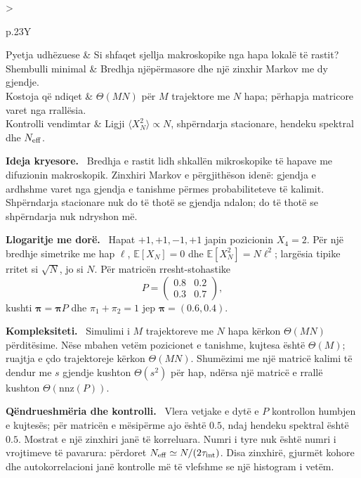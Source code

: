\documentclass[11pt,oneside,openany]{book}
\newcommand{\E}{\mathbb{E}}
\newenvironment{ideja}{\par\medskip\noindent\textbf{Ideja kryesore.}\ }{\par\medskip}
\newenvironment{llogaritjedore}{\par\medskip\noindent\textbf{Llogaritje me dorë.}\ }{\par\medskip}
\newenvironment{kompleksitet}{\par\medskip\noindent\textbf{Kompleksiteti.}\ }{\par\medskip}
\newenvironment{qendrueshmeri}{\par\medskip\noindent\textbf{Qëndrueshmëria dhe kontrolli.}\ }{\par\medskip}
\newcommand{\hartakapitullit}[4]{%
\par\smallskip
\noindent\begin{tabularx}{\textwidth}{>{\bfseries\raggedright\arraybackslash}p{.23\textwidth}Y}
Pyetja udhëzuese & #1\\
Shembulli minimal & #2\\
Kostoja që ndiqet & #3\\
Kontrolli vendimtar & #4
\end{tabularx}\par\medskip}
\begin{document}
\hartakapitullit
{Si shfaqet sjellja makroskopike nga hapa lokalë të rastit?}
{Bredhja njëpërmasore dhe një zinxhir Markov me dy gjendje.}
{$\Theta(MN)$ për $M$ trajektore me $N$ hapa; përhapja matricore varet nga rrallësia.}
{Ligji $\langle X_N^2\rangle\propto N$, shpërndarja stacionare, hendeku spektral dhe $N_{\rm eff}$.}

\begin{ideja}
Bredhja e rastit lidh shkallën mikroskopike të hapave me difuzionin
makroskopik. Zinxhiri Markov e përgjithëson idenë: gjendja e ardhshme varet
nga gjendja e tanishme përmes probabiliteteve të kalimit. Shpërndarja
stacionare nuk do të thotë se gjendja ndalon; do të thotë se shpërndarja nuk
ndryshon më.
\end{ideja}

\begin{llogaritjedore}
Hapat $+1,+1,-1,+1$ japin pozicionin $X_4=2$. Për një bredhje simetrike me
hap $\ell$, $\E[X_N]=0$ dhe $\E[X_N^2]=N\ell^2$; largësia tipike rritet si
$\sqrt N$, jo si $N$. Për matricën rresht-stohastike
\begin{equation}
 P=\begin{pmatrix}0.8&0.2\\0.3&0.7\end{pmatrix},
\end{equation}
kushti $\boldsymbol\pi=\boldsymbol\pi P$ dhe $\pi_1+\pi_2=1$ jep
$\boldsymbol\pi=(0.6,0.4)$.
\end{llogaritjedore}

\begin{kompleksitet}
Simulimi i $M$ trajektoreve me $N$ hapa kërkon $\Theta(MN)$ përditësime.
Nëse mbahen vetëm pozicionet e tanishme, kujtesa është $\Theta(M)$; ruajtja e
çdo trajektoreje kërkon $\Theta(MN)$. Shumëzimi me një matricë kalimi të
dendur me $s$ gjendje kushton $\Theta(s^2)$ për hap, ndërsa një matricë e
rrallë kushton $\Theta(\mathrm{nnz}(P))$.
\end{kompleksitet}

\begin{qendrueshmeri}
Vlera vetjake e dytë e $P$ kontrollon humbjen e kujtesës; për matricën e
mësipërme ajo është $0.5$, ndaj hendeku spektral është $0.5$. Mostrat e një
zinxhiri janë të korreluara. Numri i tyre nuk është numri i vrojtimeve të
pavarura: përdoret $N_{\rm eff}\simeq N/(2\tau_{\rm int})$. Disa zinxhirë,
gjurmët kohore dhe autokorrelacioni janë kontrolle më të vlefshme se një
histogram i vetëm.
\end{qendrueshmeri}
\end{document}
